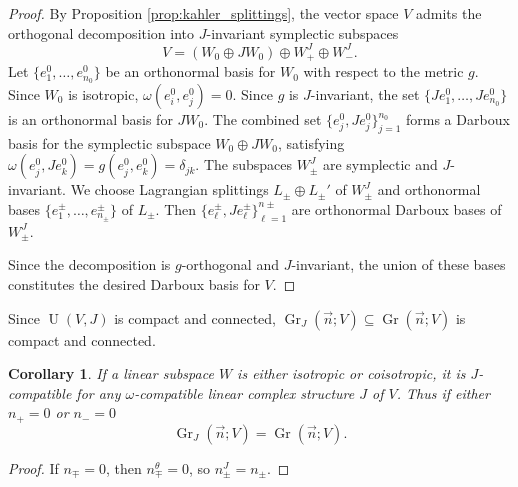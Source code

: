 \documentclass[12pt, final]{article}
\def\U{\operatorname{U}}
\def\Gr{\operatorname{Gr}}
\newtheorem{corollary}[theorem]{Corollary}
\begin{document}
\begin{proof}
By Proposition \ref{prop:kahler_splittings}, the vector space $V$ admits the orthogonal decomposition into $J$-invariant symplectic subspaces
\[
V = (W_0 \oplus J W_0) \oplus W_+^J \oplus W_-^J.
\]
Let $\{e_1^0, \dots, e_{n_0}^0\}$ be an orthonormal basis for $W_0$ with respect to the metric $g$. Since $W_0$ is isotropic, $\omega(e_i^0, e_j^0) = 0$. Since $g$ is $J$-invariant, the set $\{Je_1^0, \dots, Je_{n_0}^0\}$ is an orthonormal basis for $JW_0$. The combined set $\{e_j^0, Je_j^0\}_{j=1}^{n_0}$ forms a Darboux basis for the symplectic subspace $W_0 \oplus JW_0$, satisfying $\omega(e_j^0, Je_k^0) = g(e_j^0, e_k^0) = \delta_{jk}$.
The subspaces $W_\pm^J$ are symplectic and $J$-invariant. We choose Lagrangian splittings $L_{\pm} \oplus L_{\pm}'$ of $W_\pm^J$ and orthonormal bases $\{e_1^\pm, \dots, e_{n_\pm}^\pm\}$ of $L_\pm$. Then $\{e_\ell^\pm, Je_\ell^\pm\}_{\ell=1}^{n\pm}$ are orthonormal Darboux bases of $W_\pm^J$.

Since the decomposition is $g$-orthogonal and $J$-invariant, the union of these bases constitutes the desired Darboux basis for $V$.
\end{proof}


Since $\U(V, J)$ is compact and connected, $\Gr_J(\vec{n}; V) \subseteq \Gr(\vec{n}; V)$ is compact and connected.

\begin{corollary}
\label{cor:iso_coiso_compactness}
    If a linear subspace $W$ is either isotropic or coisotropic, it is $J$-compatible for any $\omega$-compatible linear complex structure $J$ of $V$. Thus if either $n_+ = 0$ or $n_- = 0$
    \[ \Gr_J(\vec{n}; V) = \Gr(\vec{n}; V).\]
\end{corollary}
\begin{proof}
If $n_{\mp}= 0$, then $n_{\mp}^\theta = 0$, so $n_{\pm}^J = n_{\pm}$.
\end{proof}
\end{document}
